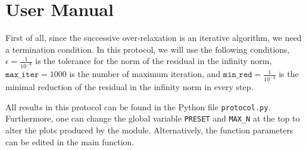\section{User Manual}

First of all, since the successive over-relaxation is an iterative algorithm, we need a termination condition. In this protocol, we will use the following conditions, \(\epsilon = \frac{1}{10^{-8}}\) is the tolerance for the norm of the residual in the infinity norm, \(\texttt{max\_iter} = 1000\) is the number of maximum iteration, and \(\texttt{min\_red} = \frac{1}{10^{-4}}\) is the minimal reduction of the residual in the infinity norm in every step.

All results in this protocol can be found in the Python file \texttt{protocol.py}. Furthermore, one can change the global variable \texttt{PRESET} and \texttt{MAX\_N} at the top to alter the plots produced by the module. Alternatively, the function parameters can be edited in the main function.